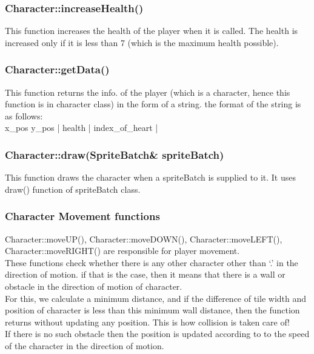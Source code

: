 \documentclass{article}
\begin{document}
\subsubsection{Character::increaseHealth()}
This function increases the health of the player when it is called. The health is increased only if it is less than 7 (which is the maximum health possible).
\newline

\subsubsection{Character::getData()}
This function returns the info. of the player (which is a character, hence this function is in character class) in the form of a string. the format of the string is as follows: \\
\newline
x\_pos y\_pos | health | index\_of\_heart |
\newline

\subsubsection{Character::draw(SpriteBatch& spriteBatch) }
This function draws the character when a spriteBatch is supplied to it. It uses draw() function of spriteBatch class.
\newline

\subsubsection{Character Movement functions}
Character::moveUP(), Character::moveDOWN(), Character::moveLEFT(), Character::moveRIGHT() are responsible for player movement.\\
\newline
These functions check whether there is any other character other than ‘.’ in the direction of motion. if that is the case, then it means that there is a wall or obstacle in the direction of motion of character. \\

For this, we calculate a minimum distance, and if the difference of tile width and position of character is less than this minimum wall distance, then the function returns without updating any position. This is how collision is taken care of! \\

If there is no such obstacle then the position is updated according to to the speed of the character in the direction of motion. \\
\end{document}
